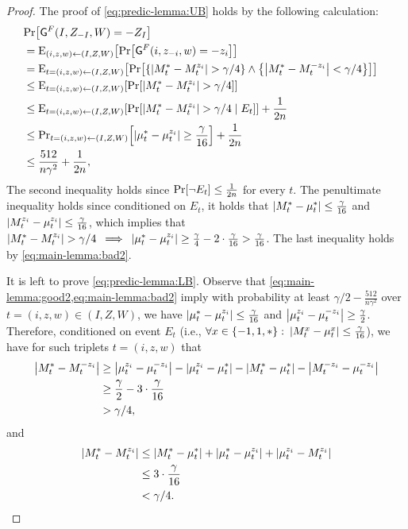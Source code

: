 \begin{proof}
	The proof of \cref{eq:predic-lemma:UB} holds by the following calculation:
	\begin{align*}
		\lefteqn{\pr{\Gc^F(I,Z_{-I},W) = -Z_I}}\\
		&= \eex{(i,z,w) \la (I,Z,W)}{\pr{\Gc^F(i,z_{-i},w) = -z_i}}\\
		&= \eex{t = (i,z,w) \la (I,Z,W)}{\pr{\set{\size{M_t^* - M_t^{z_i}} > \gamma/4} \land \set{\size{M_t^* - M_t^{-z_i}} < \gamma/4}}}\\
		&\leq \eex{t =(i,z,w) \la (I,Z,W)}{\pr{\size{M_t^* - M_t^{z_i}} > \gamma/4}}\\
		&\leq \eex{t = (i,z,w) \la (I,Z,W)}{\pr{\size{M_t^* - M_t^{z_i}} > \gamma/4 \mid E_t}} + \frac{1}{2n}\\
		&\leq \ppr{t = (i,z,w) \la (I,Z,W)}{\size{\mu_t^* -  \mu_t^{z_i}} \geq \frac{\gamma}{16}} + \frac{1}{2n}\\
		&\leq \frac{512}{n \gamma^2} + \frac1{2n},
	\end{align*}
	The second inequality holds since $\pr{\neg E_t} \leq \frac1{2n}$ for every $t$. The penultimate inequality holds since conditioned on $E_t$, it holds that $\size{M_t^* - \mu_t^*} \leq \frac{\gamma}{16}$ and $\size{M_t^{z_i} - \mu_t^{z_i}} \leq \frac{\gamma}{16}$, which implies that $\size{M_t^* - M_t^{z_i}} > \gamma/4 \: \implies \: \size{\mu_t^* -  \mu_t^{z_i}} \geq \frac{\gamma}{4} - 2\cdot \frac{\gamma}{16} > \frac{\gamma}{16}$. The last inequality holds by \cref{eq:main-lemma:bad2}.
	
	It is left to prove \cref{eq:predic-lemma:LB}. 
	Observe that \cref{eq:main-lemma:good2,eq:main-lemma:bad2} imply with probability at least $\gamma/2 - \frac{512}{n \gamma^2}$ over $t = (i,z,w)\in (I,Z,W)$, we have $\size{\mu_t^* -  \mu_t^{z_i}} \leq  \frac{\gamma}{16}$ and $\size{\mu_t^{z_i}- \mu_t^{-z_i}} \geq\frac{\gamma}{2}$. Therefore, conditioned on event $E_t$ (i.e., $\forall x \in \set{-1,1,*}: \: \size{M_t^{x} - \mu_t^{x}} \leq \frac{\gamma}{16}$), we have for such triplets $t = (i,z,w)$ that 
	\begin{align*}
		\size{M_t^* - M_t^{-z_i}} 
		& \geq \size{\mu_t^{z_i} - \mu_t^{-z_i}} - \size{\mu_t^{z_i} - \mu_t^*} - \size{M_t^*  - \mu_t^*} -  \size{M_t^{-z_i} - \mu_t^{-z_i}}\\
		&\geq \frac{\gamma}{2} - 3\cdot \frac{\gamma}{16}\\
		&> \gamma/4,
	\end{align*}
	and 
	\begin{align*}
		\size{M_t^* - M_t^{z_i}}
		&\leq  \size{M_t^* - \mu_t^*} + \size{\mu_t^* - \mu_t^{z_i}} + \size{\mu_t^{z_i} - M_t^{z_i}} \\
		&\leq 3\cdot \frac{\gamma}{16}\\
		&< \gamma/4.
	\end{align*}
	

\end{proof}

